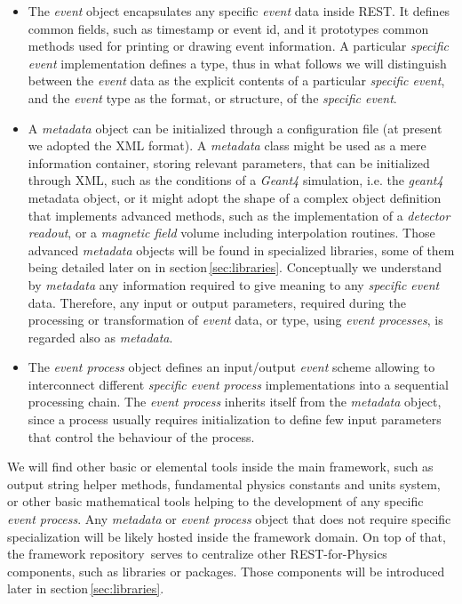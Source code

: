 \begin{itemize}
    \item The \emph{event} object encapsulates any specific \emph{event} data inside REST. It defines common fields, such as timestamp or event id, and it prototypes common methods used for printing or drawing event information. A particular \emph{specific event} implementation defines a type, thus in what follows we will distinguish between the \emph{event} data as the explicit contents of a particular \emph{specific event}, and the \emph{event} type as the format, or structure, of the \emph{specific event}.
    
    \item A \emph{metadata} object can be initialized through a configuration file (at present we adopted the XML format). A \emph{metadata} class might be used as a mere information container, storing relevant parameters, that can be initialized through XML, such as the conditions of a \emph{Geant4} simulation, i.e. the \emph{geant4} metadata object, or it might adopt the shape of a complex object definition that implements advanced methods, such as the implementation of a \emph{detector readout}, or a \emph{magnetic field} volume including interpolation routines. Those advanced \emph{metadata} objects will be found in specialized libraries, some of them being detailed later on in section\,\ref{sec:libraries}. Conceptually we understand by \emph{metadata} any information required to give meaning to any \emph{specific event} data. Therefore, any input or output parameters, required during the processing or transformation of \emph{event} data, or type, using \emph{event processes}, is regarded also as \emph{metadata}. 
    
    \item The \emph{event process} object defines an input/output \emph{event} scheme allowing to interconnect different \emph{specific event process} implementations into a sequential processing chain. The \emph{event process} inherits itself from the \emph{metadata} object, since a process usually requires initialization to define few input parameters that control the behaviour of the process.
\end{itemize}

We will find other basic or elemental tools inside the main framework, such as output string helper methods, fundamental physics constants and units system, or other basic mathematical tools helping to the development of any specific \emph{event process}. Any \emph{metadata} or \emph{event process} object that does not require specific specialization will be likely hosted inside the framework domain.
 On top of that, the framework repository\,\cite{REST_Framework_Git} serves to centralize other REST-for-Physics components, such as libraries or packages. Those components will be introduced later in section\,\ref{sec:libraries}.%

